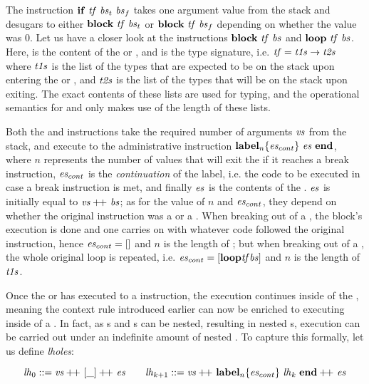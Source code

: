 \documentclass[acmsmall,screen]{acmart}\settopmatter{}
\begin{document}
The instruction \( \mathbf{if}~{\mathit{tf}}~{\mathit{bs}_t}~{\mathit{bs}_f} \) takes one argument value from the stack and desugars to either \( \mathbf{block}~{\mathit{tf}}~{\mathit{bs}_t} \) or \( \mathbf{block}~{\mathit{tf}}~{\mathit{bs}_f} \) depending on whether the value was 0. Let us have a closer look at the instructions \( \mathbf{block}~{\mathit{tf}}~{\mathit{bs}} \) and \( \mathbf{loop}~{\mathit{tf}}~{\mathit{bs}} \). Here,  is the content of the  or , and  is the type signature, i.e. \( \mathit{tf} = \mathit{t1s}\to\mathit{t2s} \) where \( \mathit{t1s} \) is the list of the types that are expected to be on the stack upon entering the  or , and \( \mathit{t2s} \) is the list of the types that will be on the stack upon exiting. The exact contents of these lists are used for typing, and the operational semantics for \xxWblock and \xxWloop only makes use of the length of these lists.

Both the \xxWblock and \xxWloop instructions take the required number of arguments \( \mathit{vs} \) from the stack, and execute to the administrative instruction \( \mathsf{\textbf{label}}_{n}\{\mathit{es}_{cont}\}~\mathit{\mathit{es}}~\mathsf{\textbf{end}} \), where \( n \) represents the number of values that will exit the  if it reaches a break instruction, \( \mathit{es}_{cont} \) is the \emph{continuation} of the label, i.e. the code to be executed in case a break instruction is met, and finally \( \mathit{es} \) is the contents of the . \( \mathit{es} \) is initially equal to \( \mathit{vs}+\kern-0.8ex+\kern0.8ex\mathit{bs} \); as for the value of \( n \) and \( \mathit{es}_{cont} \), they depend on whether the original instruction was a  or a . When breaking out of a , the block's execution is done and one carries on with whatever code followed the original  instruction, hence \( \mathit{es}_{cont} = [] \) and \( n \) is the length of ; but when breaking out of a , the whole original loop is repeated, i.e. \( \mathit{es}_{cont} = [ \mathbf{loop}{\mathit{tf}}{\mathit{bs}} ] \) and \( n \) is the length of \( \mathit{t1s} \). 

Once the  or  has executed to a  instruction, the execution continues inside of the , meaning the context rule introduced earlier can now be enriched to executing inside of a . In fact, as s and s can be nested, resulting in nested s, execution can be carried out under an indefinite amount of nested . To capture this formally, let us define \emph{lholes}:

\[ \mathit{lh}_0 ::= \mathit{vs}+\kern-0.8ex+\kern0.8ex[\_]+\kern-0.8ex+\kern0.8ex\mathit{es}\qquad\mathit{lh}_{k+1}::= \mathit{vs}+\kern-0.8ex+\kern0.8ex\mathsf{\textbf{label}}_{n}\{\mathit{es}_{cont}\}~\mathit{\mathit{lh}_k}~\mathsf{\textbf{end}}+\kern-0.8ex+\kern0.8ex\mathit{es} \]
\end{document}
